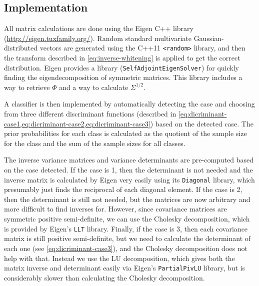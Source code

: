\documentclass[headings=optiontoheadandtoc,listof=totoc,parskip=full]{scrartcl}
\begin{document}
\subsection{Implementation}
\label{sec:part-1-impl}

All matrix calculations are done using the Eigen C++ library (\url{http://eigen.tuxfamily.org/}). Random standard multivariate Gaussian-distributed vectors are generated using the C++11 \texttt{<random>} library, and then the transform described in \cref{eq:inverse-whitening} is applied to get the correct distribution. Eigen provides a library (\texttt{SelfAdjointEigenSolver}) for quickly finding the eigendecomposition of symmetric matrices. This library includes a way to retrieve $\Phi$ and a way to calculate $\Sigma^{1/2}$.

A classifier is then implemented by automatically detecting the case and choosing from three different discriminant functions (described in \cref{eq:dicriminant-case1,eq:dicriminant-case2,eq:dicriminant-case3}) based on the detected case. The prior probabilities for each class is calculated as the quotient of the sample size for the class and the sum of the sample sizes for all classes.

The inverse variance matrices and variance determinants are pre-computed based on the case detected. If the case is 1, then the determinant is not needed and the inverse matrix is calculated by Eigen very easily using its \texttt{Diagonal} library, which presumably just finds the reciprocal of each diagonal element. If the case is 2, then the determinant is still not needed, but the matrices are now arbitrary and more difficult to find inverses for. However, since covariance matrices are symmetric positive semi-definite, we can use the Cholesky decomposition, which is provided by Eigen's \texttt{LLT} library. Finally, if the case is 3, then each covariance matrix is still positive semi-definite, but we need to calculate the determinant of each one (see \cref{eq:dicriminant-case3}), and the Cholesky decomposition does not help with that. Instead we use the LU decomposition, which gives both the matrix inverse and determinant easily via Eigen's \texttt{PartialPivLU} library, but is considerably slower than calculating the Cholesky decomposition.
\end{document}
